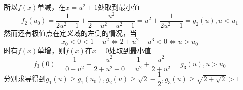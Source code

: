 \begin{solution}
    所以$f(x)$单减，在$x=u^2+1$处取到最小值
    \[f_2(u_0)=\dfrac{1}{2u^2+1}+\dfrac{u^2}{2+u^2-u^2-1}=u^2+\dfrac{1}{2u^2+1}=g_2(u),u<u_1\]
    然而还有极值点在定义域的左侧的情况，当
    \[x_0<0<1+u^2\Leftrightarrow2+u^2-u^3<0\Leftrightarrow u>u_0\]时有$f(x)$单增，则$f(x)$在$x=0$处取到最小值
    \[f_3(0)=\dfrac{1}{0+u^2}+\dfrac{u^2}{2+u^2-0}=\dfrac{1}{u^2}+\dfrac{u^2}{2+u^2}=g_3(u),u>u_0\]
    分别求导得到$g_1(u)\geq g_1(u_0),g_2(u)\geq \sqrt2-\dfrac12,g_3(u)\geq\sqrt{2+\sqrt2}>1$
\end{solution}